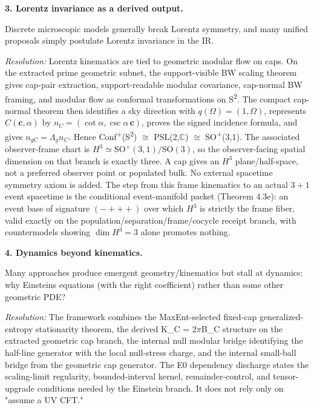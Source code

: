 \textbf{3. Lorentz invariance as a derived output.}

Discrete microscopic models generally break Lorentz symmetry, and many unified proposals simply postulate Lorentz invariance in the IR.

\emph{Resolution:} Lorentz kinematics are tied to geometric modular flow on caps. On the extracted prime geometric subnet, the support-visible BW scaling theorem gives cap-pair extraction, support-readable modular covariance, cap-normal BW framing, and modular flow as conformal transformations on S\textsuperscript{2}. The compact cap-normal theorem then identifies a sky direction with \(q(\Omega)=(1,\Omega)\), represents \(C(\mathbf c,\alpha)\) by \(n_C=(\cot\alpha,\csc\alpha\,\mathbf c)\), proves the signed incidence formula, and gives \(n_{gC}=\Lambda_g n_C\). Hence Conf\textsuperscript{+}(S\textsuperscript{2}) \ensuremath{\cong} PSL(2,\ensuremath{\mathbb{C}}) \ensuremath{\cong} SO\textsuperscript{+}(3,1). The associated observer-frame chart is \(H^3\simeq \mathrm{SO}^+(3,1)/\mathrm{SO}(3)\), so the observer-facing spatial dimension on that branch is exactly three. A cap gives an \(H^3\) plane/half-space, not a preferred observer point or populated bulk. No external spacetime symmetry axiom is added. The step from this frame kinematics to an actual \(3{+}1\) event spacetime is the conditional event-manifold packet (Theorem 4.3e): an event base of signature \((-{+}{+}{+})\) over which \(H^3\) is strictly the frame fiber, valid exactly on the population/separation/frame/cocycle receipt branch, with countermodels showing \(\dim H^3=3\) alone promotes nothing.

\textbf{4. Dynamics beyond kinematics.}

Many approaches produce emergent geometry/kinematics but stall at dynamics: why Einstein\textquotesingle s equations (with the right coefficient) rather than some other geometric PDE?

\emph{Resolution:} The framework combines the MaxEnt-selected fixed-cap generalized-entropy stationarity theorem, the derived K\_C = 2\ensuremath{\pi}B\_C structure on the extracted geometric cap branch, the internal null modular bridge identifying the half-line generator with the local null-stress charge, and the internal small-ball bridge from the geometric cap generator. The E0 dependency discharge states the scaling-limit regularity, bounded-interval kernel, remainder-control, and tensor-upgrade conditions needed by the Einstein branch. It does not rely only on "assume a UV CFT."

